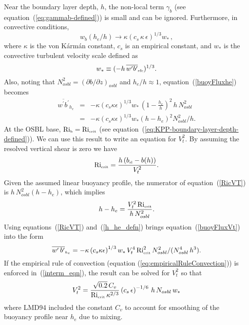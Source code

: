 \documentclass[preprint,12pt,authoryear]{agujournal}
\begin{document}
Near the boundary layer depth, $h$, the non-local term $\gamma_b$ (see equation~(\ref{eq:gammab-defined})) is small and can be ignored.  Furthermore, in convective conditions, 
\begin{equation}
\label{wsapprox}
 w_b(h_e/h) 
 \rightarrow \kappa \left(c_s \, \kappa \, \epsilon\right)^{1/3} w_*  \, ,
 \end{equation}
  where $\kappa$ is the von K\'arm\'an constant, $c_s$ is an empirical constant, and $w_{*}$ is the convective turbulent velocity scale defined as
  \begin{equation}
w_* \equiv (-h \, \overline{w^\prime b^\prime}_{\mbox{\tiny sfc}} )^{1/3}.
\label{eq:convective-velocity-scale}
\end{equation}
Also, noting that $N_{osbl}^2 = (\partial b/ \partial z)_{osbl}$ and $h_e/h \approx 1$, equation~(\ref{buoyFluxhe}) becomes
\begin{eqnarray}
\overline{w^\prime b^\prime}_{h_e} &=& -\kappa \left(c_s \kappa \epsilon\right)^{1/3} w_* \, \left(1 - \frac{h_e}{h}\right)^2 \, h \, N_{osbl}^2 \nonumber \\
&=& -\kappa \left(c_s \kappa \epsilon \right)^{1/3} w_* \left(h - h_e\right)^2 N_{osbl}^2/h. 
\label{buoyFluxVt}
\end{eqnarray}
At the OSBL base, $\mbox{Ri}_{\mbox{\tiny b}} = \mbox{Ri}_{\mbox{\tiny crit}}$ (see equation~(\ref{eq:KPP-boundary-layer-depth-defined})).  We can use this result to write an equation for $V_t^2$.  By assuming the resolved vertical shear is zero we have
\begin{equation}
\label{RicVT}
\mbox{Ri}_{\mbox{\tiny crit}}= \frac{h \, (b_{\tiny \mbox{sl}} - b(h))}{V_t^2}.
\end{equation}
Given the assumed linear buoyancy profile, the numerator of equation~(\ref{RicVT}) is $h \, N_{osbl}^2 (h-h_e)$, which implies 
\begin{equation}
\label{h_he_defn}
h - h_e = \frac{V_t^2 \, \mbox{Ri}_{\mbox{\tiny crit}}}
{h \, N_{osbl}^2}.
\end{equation}
Using equations~(\ref{RicVT}) and~(\ref{h_he_defn}) brings equation~(\ref{buoyFluxVt}) into the form 
\begin{equation}
\label{interm_eqn}
\overline{w^\prime \, b^\prime}_{\mbox{\tiny $h_e$}} = 
-\kappa \left(c_s \kappa \epsilon \right)^{1/3} w_* \, V_t^4 \, \mbox{Ri}_{\mbox{\tiny crit}}^2 \, N_{osbl}^2 / (N_{osbl}^4 \, h^3).
\end{equation}
If the empirical rule of convection (equation (\ref{eq:empiricalRuleConvection})) is enforced in~(\ref{interm_eqn}), the result can be solved for $V_t^2$ so that 
\begin{equation}
V_t^2 = \frac{ \sqrt{0.2} \,  C_v}
    {\mbox{Ri}_{\mbox{\tiny crit}} \, \kappa^{2/3}} 
 \left(c_s \, \epsilon \right)^{-1/6} \, h \, N_{osbl} \, w_*
 \label{eq:vt2}
\end{equation}
where LMD94 included the constant $C_v$ to account for smoothing of the buoyancy profile near $h_e$ due to mixing.  
\end{document}
